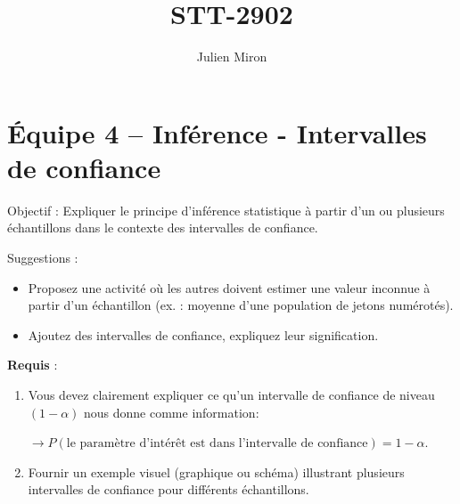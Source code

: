 \documentclass{article}
\title{STT-2902}
\author{Julien Miron}
\begin{document}
\section*{Équipe 4 – Inférence - Intervalles de confiance}

Objectif : Expliquer le principe d’inférence statistique à partir d’un ou plusieurs échantillons dans le contexte des intervalles de confiance.


\vspace{1cm}
Suggestions :
\begin{itemize}
    \item Proposez une activité où les autres doivent estimer une valeur inconnue à partir d’un échantillon (ex. : moyenne d’une population de jetons numérotés).
    \item Ajoutez des intervalles de confiance, expliquez leur signification.

\end{itemize}


\vspace{1cm}
\textbf{Requis} :
\begin{enumerate}
    \item Vous devez clairement expliquer ce qu'un intervalle de confiance de niveau $(1-\alpha)$ nous donne comme information:
    
    $\rightarrow P( \text{le paramètre d'intérêt est dans l'intervalle de confiance} )=1-\alpha$. 
    \item Fournir un exemple visuel (graphique ou schéma) illustrant plusieurs intervalles de confiance pour différents échantillons.
\end{enumerate}
\end{document}
